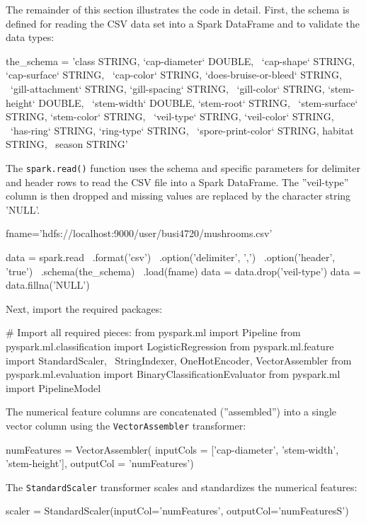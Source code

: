 The remainder of this section illustrates the code in detail. First, the schema is defined for reading the CSV data set into a Spark DataFrame and to validate the data types:

\begin{pythoncode}
the_schema = 'class STRING, `cap-diameter` DOUBLE, \
    `cap-shape` STRING, `cap-surface` STRING, \
    `cap-color` STRING, `does-bruise-or-bleed` STRING, \
    `gill-attachment` STRING, `gill-spacing` STRING, \
    `gill-color` STRING, `stem-height` DOUBLE, \
    `stem-width` DOUBLE, `stem-root` STRING, \
    `stem-surface` STRING, `stem-color` STRING, \
    `veil-type` STRING, `veil-color` STRING, \
    `has-ring` STRING, `ring-type` STRING, \
    `spore-print-color` STRING, habitat STRING, \
    season STRING'
\end{pythoncode}

The \texttt{spark.read()} function uses the schema and specific parameters for delimiter and header rows to read the CSV file into a Spark DataFrame. The ''veil-type'' column is then dropped and missing values are replaced by the character string 'NULL'.

\begin{pythoncode}
fname='hdfs://localhost:9000/user/busi4720/mushrooms.csv'

data = spark.read \
    .format('csv') \
    .option('delimiter', ',') \
    .option('header', 'true') \
    .schema(the_schema) \
    .load(fname)
data = data.drop('veil-type')
data = data.fillna('NULL')
\end{pythoncode}

Next, import the required packages:
\begin{pythoncode}
# Import all required pieces:
from pyspark.ml import Pipeline
from pyspark.ml.classification import LogisticRegression
from pyspark.ml.feature import StandardScaler, \
    StringIndexer, OneHotEncoder, VectorAssembler
from pyspark.ml.evaluation import BinaryClassificationEvaluator
from pyspark.ml import PipelineModel
\end{pythoncode}

The numerical feature columns are concatenated (''assembled'') into a single vector column using the \texttt{VectorAssembler} transformer:
\begin{pythoncode}
numFeatures = VectorAssembler(
    inputCols = ['cap-diameter', 'stem-width', 'stem-height'],
    outputCol = 'numFeatures')
\end{pythoncode}

The \texttt{StandardScaler} transformer scales and standardizes the numerical features:
\begin{pythoncode}
scaler = StandardScaler(inputCol='numFeatures',
                        outputCol='numFeaturesS')
\end{pythoncode}

